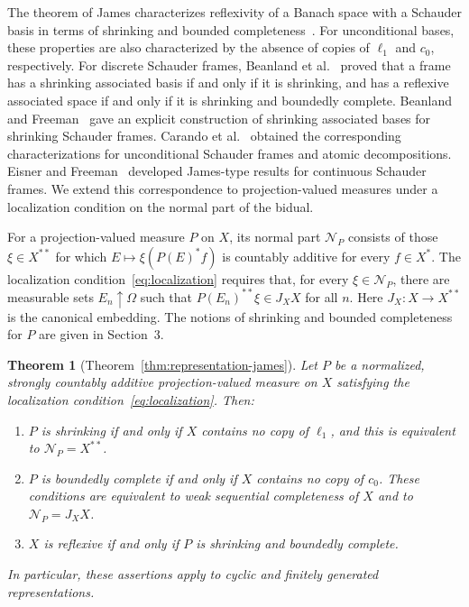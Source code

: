 \documentclass[11pt,leqno]{amsart}
\theoremstyle{compact}
\newtheorem{maintheorem}{Theorem}
\numberwithin{equation}{section}
\theoremstyle{compactremark}
\theoremstyle{compact}
\newcommand{\1}{\mathbbm{1}}
\newcommand{\mnote}[2][0pt]{%
    \marginnote{%
        \parbox[t]{1.8cm}{%
            \raggedright\tiny #2%
        }%
    }[#1]%
}
\begin{document}
The theorem of James characterizes reflexivity of a Banach space with a Schauder basis in terms of shrinking and bounded completeness~\cite{AlbiacKalton2016}.
For unconditional bases, these properties are also characterized by the absence of copies of $\ell_1$ and $c_0$, respectively. For discrete Schauder frames, Beanland et al.~\cite{BeanlandFreemanLiu2015} proved that a frame has a shrinking associated basis if and only if it is shrinking, and has a reflexive associated space if and only if it is shrinking and boundedly complete. Beanland and Freeman~\cite{BeanlandFreeman2024} gave an explicit construction of shrinking associated bases for shrinking Schauder frames. Carando et al.~\cite{CarandoLassalleSchmidberg2011} obtained the corresponding characterizations for unconditional Schauder frames and atomic decompositions. Eisner and Freeman~\cite{EisnerFreeman2020} developed James-type results for continuous Schauder frames. We extend this correspondence to projection-valued measures under a localization condition on the normal part of the bidual.



For a projection-valued measure $P$ on $X$, its normal part $\mathcal N_P$ consists of those $\xi\in X^{**}$ for which $E\mapsto\xi(P(E)^*f)$ is countably additive for every $f\in X^*$. The localization condition~\eqref{eq:localization} requires that, for every $\xi\in\mathcal N_P$, there are measurable sets $E_n\uparrow\Omega$ such that $P(E_n)^{**}\xi\in J_XX$ for all $n$. Here $J_X\colon X\to X^{**}$ is the canonical embedding. The notions of shrinking and bounded completeness for $P$ are given in Section~3.

\begin{maintheorem}[Theorem~\ref{thm:representation-james}]\label{intro:james}
Let $P$ be a normalized, strongly countably additive projection-valued measure on $X$ satisfying the localization condition~\eqref{eq:localization}. Then:
\begin{enumerate}
\item $P$ is shrinking if and only if $X$ contains no copy of $\ell_1$, and this is equivalent to $\mathcal N_P=X^{**}$.
\item $P$ is boundedly complete if and only if $X$ contains no copy of $c_0$. These conditions are equivalent to weak sequential completeness of $X$ and to $\mathcal N_P=J_XX$.
\item $X$ is reflexive if and only if $P$ is shrinking and boundedly complete.
\end{enumerate}
In particular, these assertions apply to cyclic and finitely generated representations.
\end{maintheorem}
\end{document}
